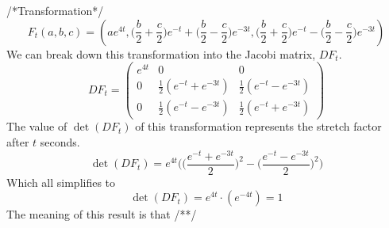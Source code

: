 \documentclass[a4paper]{article}
\begin{document}
/*Transformation*/
\begin{equation}
F_t(a,b,c) = (ae^{4t}, \bigg(\frac{b}{2}+\frac{c}{2}\bigg)e^{-t}+\bigg(\frac{b}{2}-\frac{c}{2}\bigg)e^{-3t}, 
\bigg(\frac{b}{2}+\frac{c}{2}\bigg)e^{-t}-\bigg(\frac{b}{2}-\frac{c}{2}\bigg)e^{-3t})
\label{transformation2}
\end{equation}
We can break down this transformation into the Jacobi matrix, $DF_t$.
\begin{equation*}
DF_t = \begin{pmatrix} e^{4t} & 0 & 0	\\
0 & \frac{1}{2}(e^{-t}+e^{-3t}) & \frac{1}{2}(e^{-t}-e^{-3t}) \\[1ex]
0 & \frac{1}{2}(e^{-t}-e^{-3t}) & \frac{1}{2}(e^{-t}+e^{-3t}) \end{pmatrix}
\end{equation*}
The value of $\det(DF_t)$ of this transformation represents the stretch factor after $t$ seconds.
\begin{equation*}
\det(DF_t) = e^{4t}\bigg(\Big(\frac{e^{-t}+e^{-3t}}{2}\Big)^2-\Big(\frac{e^{-t}-e^{-3t}}{2}\Big)^2\bigg)
\end{equation*}
Which all simplifies to 
\begin{equation*}
\det(DF_t) = e^{4t}\cdot(e^{-4t})=1
\label{stretch2_Ft}
\end{equation*}
The meaning of this result is that /**/
\end{document}
